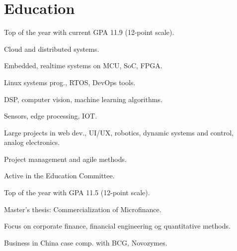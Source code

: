 \documentclass[a4paper]{janus-resume}
\begin{document}
\begin{minipage}[t]{0.49\textwidth} %


\section{Education} 

Top of the year with current GPA 11.9 (12-point scale).
\vspace{\topsep}
\begin{tightitemize}
\item Cloud and distributed systems. \\
\item Embedded, realtime systems on MCU, SoC, FPGA. \\
\item Linux systems prog., RTOS, DevOps tools. \\
\item DSP, computer vision, machine learning algorithms. \\
\item Sensors, edge processing, IOT.
\item Large projects in web dev., UI/UX, robotics, dynamic systems and control, analog electronics. \\
\item Project management and agile methods.
\item Active in the Education Committee.
\end{tightitemize}

\sectionspace %

Top of the year with GPA 11.5 (12-point scale).
\begin{tightitemize}
\item Master's thesis: Commercialization of Microfinance. \\
\item Focus on corporate finance, financial engineering og quantitative methods. \\
\item Business in China case comp. with BCG, Novozymes. \\
\end{tightitemize}


\end{minipage}
\end{document}
